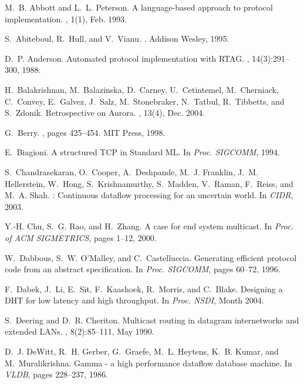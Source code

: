 \begin{thebibliography}{10}

M.~B. Abbott and L.~L. Peterson.
\newblock A language-based approach to protocol implementation.
, 1(1), Feb. 1993.

S.~Abiteboul, R.~Hull, and V.~Vianu.
.
\newblock Addison Wesley, 1995.

D.~P. Anderson.
\newblock Automated protocol implementation with {RTAG}.
, 14(3):291--300, 1988.

H.~Balakrishnan, M.~Balazinska, D.~Carney, U.~Cetintemel, M.~Cherniack,
  C.~Convey, E.~Galvez, J.~Salz, M.~Stonebraker, N.~Tatbul, R.~Tibbetts, and
  S.~Zdonik.
\newblock Retrospective on {A}urora.
, 13(4), Dec. 2004.

G.~Berry.
, pages 425--454.
\newblock MIT Press, 1998.

E.~Biagioni.
\newblock A structured {TCP} in {S}tandard {ML}.
\newblock In {\em Proc. SIGCOMM}, 1994.

S.~Chandrasekaran, O.~Cooper, A.~Deshpande, M.~J. Franklin, J.~M. Hellerstein,
  W.~Hong, S.~Krishnamurthy, S.~Madden, V.~Raman, F.~Reiss, and M.~A. Shah.
: Continuous dataflow processing for an uncertain world.
\newblock In {\em CIDR}, 2003.

Y.-H. Chu, S.~G. Rao, and H.~Zhang.
\newblock A case for end system multicast.
\newblock In {\em Proc. of ACM SIGMETRICS}, pages 1--12, 2000.

W.~Dabbous, S.~W. O'Malley, and C.~Castelluccia.
\newblock Generating efficient protocol code from an abstract specification.
\newblock In {\em Proc. SIGCOMM}, pages 60--72, 1996.

F.~Dabek, J.~Li, E.~Sit, F.~Kaashoek, R.~Morris, and C.~Blake.
\newblock Designing a {DHT} for low latency and high throughput.
\newblock In {\em Proc. NSDI}, Month 2004.

S.~Deering and D.~R. Cheriton.
\newblock Multicast routing in datagram internetworks and extended {LAN}s.
, 8(2):85--111, May 1990.

D.~J. DeWitt, R.~H. Gerber, G.~Graefe, M.~L. Heytens, K.~B. Kumar, and
  M.~Muralikrishna.
\newblock Gamma - a high performance dataflow database machine.
\newblock In {\em VLDB}, pages 228--237, 1986.


\end{thebibliography}

